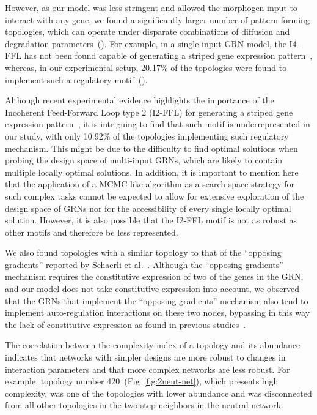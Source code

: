 \documentclass[10pt,letterpaper]{article}
\begin{document}
However, as our model was less stringent and allowed the morphogen input to
interact with any gene, we found a significantly larger number of pattern-forming
topologies, which can operate under disparate combinations of diffusion and degradation
parameters~(). For example, in a single input GRN model, the I4-FFL
has not been found capable of generating a striped gene expression
pattern~\cite{munteanu_2014}, whereas, in our experimental setup, 20.17\% of
the topologies were found  to implement such a regulatory motif~().

Although recent experimental evidence highlights the importance of the Incoherent
Feed-Forward Loop type 2 (I2-FFL) for generating a striped gene expression
pattern~\cite{Schaerli2014, Basu2005}, it is intriguing to find that such motif is
underrepresented in our study, with only 10.92\% of the topologies implementing
such regulatory mechanism. This might be due to the difficulty to find optimal
solutions when probing the design space of multi-input GRNs, which are likely to
contain multiple locally optimal solutions. In addition, it is important to mention
here that the application of a MCMC-like algorithm as a search space strategy for
such complex tasks cannot be expected to allow for extensive exploration of the
design space of GRNs nor for the accessibility of every single locally optimal
solution. However, it is also possible that the I2-FFL motif is not as robust as
other motifs and therefore be less represented.

We also found topologies with a similar topology to that of the “opposing
gradients” reported by Schaerli et al.~\cite{Schaerli2018,Schaerli2014}.
Although the “opposing gradients” mechanism requires the constitutive expression
of two of the genes in the GRN, and our model does not take constitutive
expression into account, we observed that the GRNs that implement the “opposing
gradients” mechanism also tend to implement auto-regulation interactions on
these two nodes, bypassing in this way the lack of constitutive
expression as found in previous studies~\cite{munteanu_2014}.

The correlation between the complexity index of a topology and its abundance
indicates that networks with simpler designs are more robust to changes in
interaction parameters and that more complex networks are less robust. For
example, topology number 420~(Fig~\ref{fig:2neut-net}), which
presents high complexity, was one of the
topologies with lower abundance and was disconnected from all other topologies
in the two-step neighbors in the neutral network.
\end{document}

